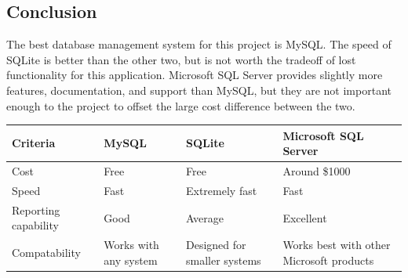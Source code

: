 \documentclass[onecolumn, draftclsnofoot,10pt, compsoc]{IEEEtran}
\begin{document}
\subsection{Conclusion}
The best database management system for this project is MySQL. The speed of SQLite is better than the other two, but is not worth the tradeoff of lost functionality for this application. Microsoft SQL Server provides slightly more features, documentation, and support than MySQL, but they are not important enough to the project to offset the large cost difference between the two.

\begin{table}[h!]
\centering
\begin{tabular}{ |l|l|l|l| } 
\hline
\textbf{Criteria} & \textbf{MySQL} & \textbf{SQLite} & \textbf{Microsoft SQL Server} \\ \hline
Cost & Free & Free & Around \$1000 \\ \hline
Speed & Fast & Extremely fast & Fast \\ \hline
Reporting capability & Good & Average & Excellent \\ \hline
Compatability & Works with any system & Designed for smaller systems & Works best with other Microsoft products \\ \hline
\end{tabular}
\end{table}

\newpage


\end{document}
